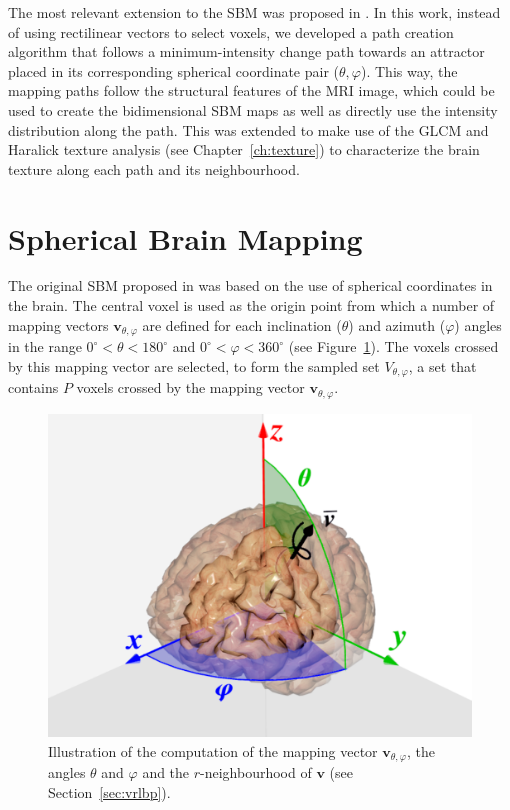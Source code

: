 The most relevant extension to the \ac{SBM} was proposed in \cite{Martinez-Murcia2016}. In this work, instead of using rectilinear vectors to select voxels, we developed a path creation algorithm that follows a minimum-intensity change path towards an attractor placed in its corresponding spherical coordinate pair ($\theta,\varphi$). This way, the mapping paths follow the structural features of the \ac{MRI} image, which could be used to create the bidimensional \ac{SBM} maps as well as directly use the intensity distribution along the path. This was extended to make use of the \ac{GLCM} and Haralick texture analysis (see Chapter~\ref{ch:texture}) to characterize the brain texture along each path and its neighbourhood. 


\section{Spherical Brain Mapping}
The original \ac{SBM} proposed in \cite{Martinez-Murcia2014225,Martinez-Murcia2015} was based on the use of spherical coordinates in the brain. The central voxel is used as the origin point from which a number of mapping vectors $\mathbf{v}_{\theta,\varphi}$ are defined for each inclination ($\theta$) and azimuth ($\varphi$) angles in the range $0^{\circ}<\theta<180^{\circ}$ and $0^{\circ}<\varphi<360^{\circ}$ (see Figure~\ref{fig:brainmapping}). The voxels crossed by this mapping vector are selected, to form the sampled set $V_{\theta,\varphi}$, a set that contains $P$ voxels crossed by the mapping vector $\mathbf{v}_{\theta,\varphi}$.

\begin{figure}[htp]
	\centering
	\includegraphics[width=0.7\columnwidth]{Graphics/ch6/02-projection}
	\caption{Illustration of the computation of the mapping vector $\mathbf{v}_{\theta,\varphi}$, the angles $\theta$ and $\varphi$ and the $r$-neighbourhood of $\mathbf{v}$ (see Section~\ref{sec:vrlbp}).}
	\label{fig:brainmapping}
\end{figure}

